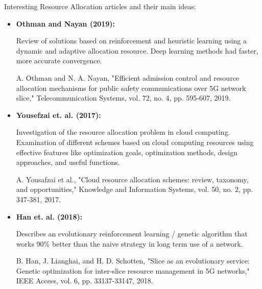 \documentclass[12pt]{article} %
\begin{document}
    Interesting Resource Allocation articles and their main ideas:
    \begin{itemize}
        \item \textbf{Othman and Nayan (2019): }

            Review of solutions based on reinforcement and heuristic learning using a dynamic and adaptive allocation resource. Deep learning methods had faster, more accurate convergence. 
            
            A. Othman and N. A. Nayan, "Efficient admission control and resource allocation mechanisms for public safety
    communications over 5G network slice," Telecommunication Systems, vol. 72, no. 4, pp. 595-607, 2019.

        \item \textbf{Yousefzai et. al. (2017): }
    
            Investigation of the resource allocation problem in cloud computing. Examination of different schemes based on cloud computing resources using effective features like optimization goals, optimization methods, design approaches, and useful functions. 
            
            A. Yousafzai et al., "Cloud resource allocation schemes: review, taxonomy, and opportunities," Knowledge and Information Systems, vol. 50, no. 2, pp. 347-381, 2017.
            
        \item \textbf{Han et. al. (2018): }
    
            Describes an evolutionary reinforcement learning / genetic algorithm that works 90\% better than the naive strategy in long term use of a network. 
            
            B. Han, J. Lianghai, and H. D. Schotten, "Slice as an evolutionary service: Genetic optimization for inter-slice resource management in 5G networks," IEEE Access, vol. 6, pp. 33137-33147, 2018.
        
    \end{itemize}




\end{document}
